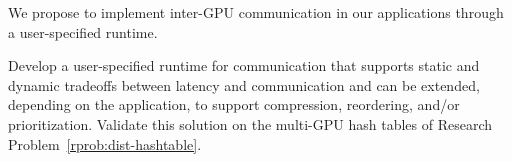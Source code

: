 We propose to implement inter-GPU communication in our applications through a user-specified runtime.

\begin{rproblem}
Develop a user-specified runtime for communication that supports static and dynamic tradeoffs between latency and communication and can be extended, depending on the application, to support compression, reordering, and/or prioritization. Validate this solution on the multi-GPU hash tables of Research Problem~\ref{rprob:dist-hashtable}.
\end{rproblem}


